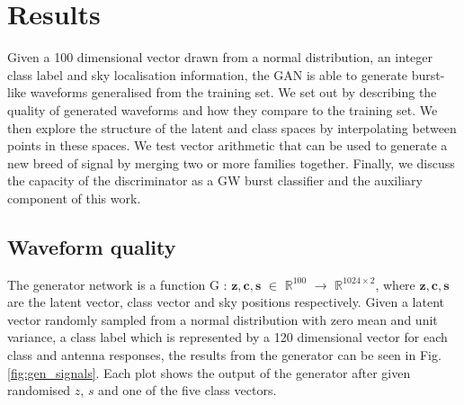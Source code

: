 \documentclass[12pt]{iopart}
\begin{document}
\section{Results}

Given a 100 dimensional vector drawn from a normal distribution, an integer class label and sky localisation information, the GAN is able to generate burst-like waveforms  generalised from the training set. We set out by describing the quality of generated waveforms and how they compare to the training set. We then explore the structure of the latent and class spaces by interpolating between points in these spaces. We test vector arithmetic that can be used to generate a new breed of signal by merging two or more families together. Finally, we discuss the capacity of the discriminator as a GW burst classifier and the auxiliary component of this work. 

\subsection{Waveform quality}
The generator network is a function G : $\mathbf{z},\mathbf{c},\mathbb{\textbf{s}}$ $\in$ $\mathbb{R}^{100}$ $\to$ $\mathbb{R}^{1024\times2}$, where $\mathbf{z},\mathbf{c},\mathbb{\textbf{s}}$ are the latent vector, class vector and sky positions respectively. Given a latent vector randomly sampled from a normal distribution with zero mean and unit variance, a class label which is represented by a 120 dimensional vector for each class and antenna responses, the results from the generator can be seen in Fig. \ref{fig:gen_signals}. Each plot shows the output of the generator after given randomised $z$, $s$ and one of the five class vectors. 
\end{document}
